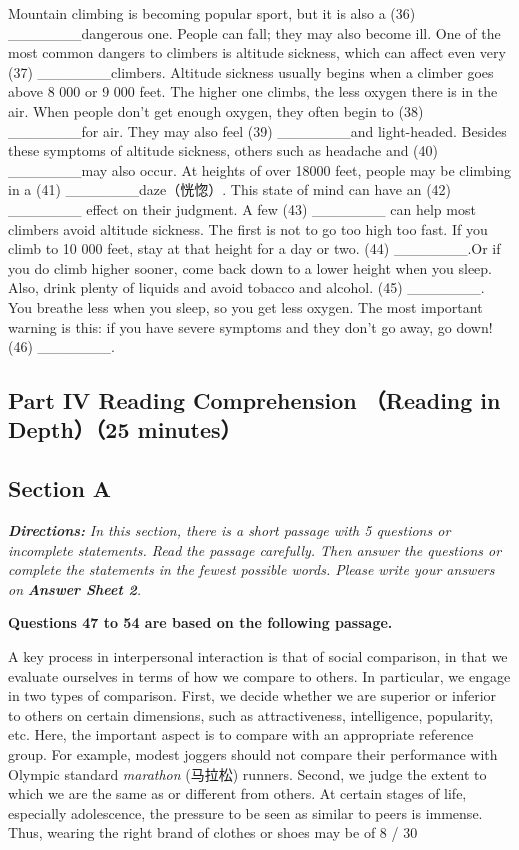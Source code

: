 \documentclass[UTF8,11pt]{ctexart}
\begin{document}
Mountain climbing is becoming popular sport, but it is also a (36) \_\_\_\_\_\_\_dangerous one. People can fall; they may also become ill. One of the most common dangers to climbers is altitude sickness, which can affect even very (37) \_\_\_\_\_\_\_climbers. Altitude sickness usually begins when a climber goes above 8 000 or 9 000 feet. The higher one climbs, the less oxygen there is in the air. When people don't get enough oxygen, they often begin to (38) \_\_\_\_\_\_\_for air. They may also feel (39) \_\_\_\_\_\_\_and light-headed. Besides these symptoms of altitude sickness, others such as headache and (40) \_\_\_\_\_\_\_may also occur. At heights of over 18000 feet, people may be climbing in a (41) \_\_\_\_\_\_\_daze（恍惚）. This state of mind can have an (42) \_\_\_\_\_\_\_ effect on their judgment. A few (43) \_\_\_\_\_\_\_ can help most climbers avoid altitude sickness. The first is not to go too high too fast. If you climb to 10 000 feet, stay at that height for a day or two. (44) \_\_\_\_\_\_\_.Or if you do climb higher sooner, come back down to a lower height when you sleep. Also, drink plenty of liquids and avoid tobacco and alcohol. (45) \_\_\_\_\_\_\_. You breathe less when you sleep, so you get less oxygen. The most important warning is this: if you have severe symptoms and they don't go away, go down! (46) \_\_\_\_\_\_\_.


\subsection*{\textbf{Part} IV \textbf{Reading Comprehension} （\textbf{Reading in Depth}）（\textbf{25 minutes}）}


\subsection*{\textbf{Section A}}


\textbf{\textit{Directions:}}\textit{ In this section, there is a short passage with 5 questions or incomplete statements. Read} \textit{the passage carefully. Then answer the questions or complete the statements in the} \textit{fewest possible words. Please write your answers on}\textbf{\textit{ Answer Sheet 2}}\textit{.}


\textbf{Questions 47 to 54 are based on the following passage.}


A key process in interpersonal interaction is that of social comparison, in that we evaluate ourselves in terms of how we compare to others. In particular, we engage in two types of comparison. First, we decide whether we are superior or inferior to others on certain dimensions, such as attractiveness, intelligence, popularity, etc. Here, the important aspect is to compare with an appropriate reference group. For example, modest joggers should not compare their performance with Olympic standard\textit{ marathon} (马拉松) runners. Second, we judge the extent to which we are the same as or different from others. At certain stages of life, especially adolescence, the pressure to be seen as similar to peers is immense. Thus, wearing the right brand of clothes or shoes may be of 8 / 30
\end{document}
